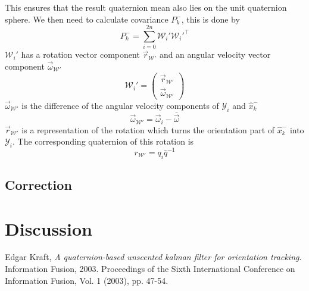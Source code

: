\documentclass[twoside]{article}
\newcommand{\W}{\mathcal{W}}
\newcommand{\Y}{\mathcal{Y}}
\begin{document}
\begin{multicols}{2}
\begin{equation}
\end{equation}
This ensures that the result quaternion mean also lies on the unit quaternion sphere.
We then need to calculate covariance $P^-_k$, this is done by 
\begin{equation}
P^-_k = \sum^{2n}_{i=0}\W_i'\W_i'^\top
\end{equation}
$\W_i'$ has a rotation vector component $\vec{r}_{\W'}$ and an angular velocity vector component $\vec{\omega}_{\W'}$
\begin{equation}
\W_i'=\begin{pmatrix}\vec{r}_{\W'} \\ \vec{\omega}_{\W'}\end{pmatrix}
\end{equation}
$\vec{\omega}_{\W'}$ is the difference of the angular velocity components of $\Y_i$ and $\hat{x}^-_k$
\begin{equation}
\vec{\omega}_{\W'} = \vec{\omega}_i - \bar{\vec{\omega}}
\end{equation}
$\vec{r}_{\W'}$ is a representation of the rotation which turns the orientation part of $\hat{x}^-_k$ into $\Y_i$. The corresponding quaternion of this rotation is 
\begin{equation}
r_{\W'} = q_i \bar{q}^{-1}
\end{equation}

\subsection{Correction}


\section{Discussion}


\begin{thebibliography}{2} %

Edgar Kraft, \emph{A quaternion-based unscented kalman filter for orientation tracking}. Information Fusion, 2003. Proceedings of the Sixth International Conference on Information Fusion, Vol. 1 (2003), pp. 47-54.


\end{thebibliography}
\end{multicols}
\end{document}
